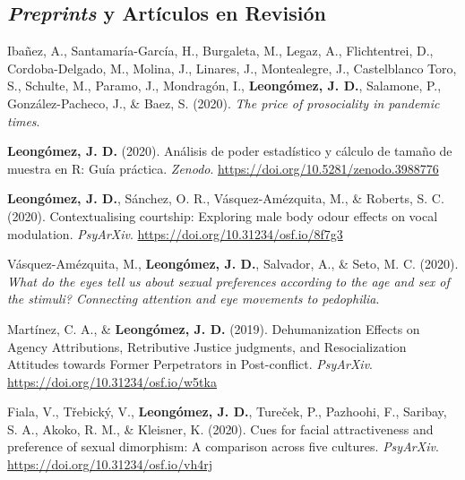 \documentclass[11pt, a4paper]{awesome-cv}
\begin{document}
\hypertarget{preprints-y-artuxedculos-en-revisiuxf3n}{%
\subsection{\texorpdfstring{\emph{Preprints} y Artículos en
Revisión}{Preprints y Artículos en Revisión}}\label{preprints-y-artuxedculos-en-revisiuxf3n}}

\begingroup
\setlength{\parindent}{-0.5in}
\setlength{\leftskip}{0.5in}

\hypertarget{refs_working_paper}{}
\leavevmode\hypertarget{ref-Inanez2020}{}%
Ibañez, A., Santamaría-García, H., Burgaleta, M., Legaz, A.,
Flichtentrei, D., Cordoba-Delgado, M., Molina, J., Linares, J.,
Montealegre, J., Castelblanco Toro, S., Schulte, M., Paramo, J.,
Mondragón, I., \textbf{Leongómez, J. D.}, Salamone, P.,
González-Pacheco, J., \& Baez, S. (2020). \emph{{The price of
prosociality in pandemic times}}.

\leavevmode\hypertarget{ref-Leongomez2020a}{}%
\textbf{Leongómez, J. D.} (2020). {Análisis de poder estadístico y
cálculo de tamaño de muestra en R: Guía práctica}. \emph{Zenodo}.
\url{https://doi.org/10.5281/zenodo.3988776}

\leavevmode\hypertarget{ref-Leongomez2020}{}%
\textbf{Leongómez, J. D.}, Sánchez, O. R., Vásquez-Amézquita, M., \&
Roberts, S. C. (2020). Contextualising courtship: Exploring male body
odour effects on vocal modulation. \emph{PsyArXiv}.
\url{https://doi.org/10.31234/osf.io/8f7g3}

\leavevmode\hypertarget{ref-Vasquez2021}{}%
Vásquez-Amézquita, M., \textbf{Leongómez, J. D.}, Salvador, A., \& Seto,
M. C. (2020). \emph{{What do the eyes tell us about sexual preferences
according to the age and sex of the stimuli? Connecting attention and
eye movements to pedophilia}}.

\leavevmode\hypertarget{ref-Martinez2019}{}%
Martínez, C. A., \& \textbf{Leongómez, J. D.} (2019). Dehumanization
{Effects} on {Agency Attributions}, {Retributive Justice} judgments, and
{Resocialization Attitudes} towards {Former Perpetrators} in
{Post}-conflict. \emph{PsyArXiv}.
\url{https://doi.org/10.31234/osf.io/w5tka}

\leavevmode\hypertarget{ref-Fiala2020}{}%
Fiala, V., Třebický, V., \textbf{Leongómez, J. D.}, Tureček, P.,
Pazhoohi, F., Saribay, S. A., Akoko, R. M., \& Kleisner, K. (2020). Cues
for facial attractiveness and preference of sexual dimorphism: {A}
comparison across five cultures. \emph{PsyArXiv}.
\url{https://doi.org/10.31234/osf.io/vh4rj}
\end{document}
